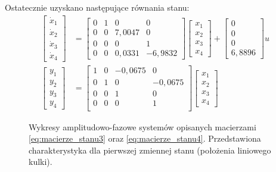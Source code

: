 Ostatecznie uzyskano następujące równania stanu:
\begin{align}
\begin{bmatrix}
    \dot{x}_1 \\ \dot{x}_2 \\ \dot{x}_3 \\ \dot{x}_4
\end{bmatrix}
&= \begin{bmatrix}
    0 & 1 & 0 & 0 \\
    0 & 0 & 7,0047 & 0 \\
    0 & 0 & 0 & 1 \\
    0 & 0 & 0,0331 & -6,9832
\end{bmatrix}
\begin{bmatrix}
    x_1 \\ x_2 \\ x_3 \\ x_4
\end{bmatrix}
+
\begin{bmatrix}
    0 \\ 0 \\ 0 \\ 6,8896
\end{bmatrix}
u \label{eq:rownania_stanu} \\%
\begin{bmatrix}
    y_1 \\ y_2 \\ y_3 \\ y_4
\end{bmatrix}
&= \begin{bmatrix}
    1 & 0 & -0,0675 & 0 \\
    0 & 1 & 0 & -0,0675 \\
    0 & 0 & 1 & 0 \\
    0 & 0 & 0 & 1 \\
\end{bmatrix}
\begin{bmatrix}
x_1 \\ x_2 \\ x_3 \\ x_4
\end{bmatrix} \label{eq:rownania_wyjscia} 
\end{align}

\begin{figure}[h]
    \centering
    
    \caption{Wykresy amplitudowo-fazowe systemów opisanych macierzami \eqref{eq:macierze_stanu3} oraz \eqref{eq:macierze_stanu4}. Przedstawiona charakterystyka dla pierwszej zmiennej stanu (położenia linio\-wego kulki).}
    \label{fig:charakterystyka_amplitudowo_fazowa}
\end{figure}

